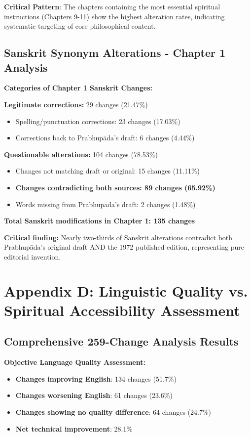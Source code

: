 \documentclass[11pt,twoside]{book}
\begin{document}
\textbf{\textbf{Critical Pattern}}: The chapters containing the most essential spiritual instructions (Chapters 9-11) show the highest alteration rates, indicating systematic targeting of core philosophical content.
\section*{Sanskrit Synonym Alterations - Chapter 1 Analysis}
\label{sec:org0084163}

\textbf{\textbf{Categories of Chapter 1 Sanskrit Changes:}}

\textbf{\textbf{Legitimate corrections:}} 29 changes (21.47\%)
\begin{itemize}
\item Spelling/punctuation corrections: 23 changes (17.03\%)
\item Corrections back to Prabhupāda's draft: 6 changes (4.44\%)
\end{itemize}

\textbf{\textbf{Questionable alterations:}} 104 changes (78.53\%)  
\begin{itemize}
\item Changes not matching draft or original: 15 changes (11.11\%)
\item \textbf{\textbf{Changes contradicting both sources: 89 changes (65.92\%)}}
\item Words missing from Prabhupāda's draft: 2 changes (1.48\%)
\end{itemize}

\textbf{\textbf{Total Sanskrit modifications in Chapter 1: 135 changes}}

\textbf{\textbf{Critical finding:}} Nearly two-thirds of Sanskrit alterations contradict both Prabhupāda's original draft AND the 1972 published edition, representing pure editorial invention.
\chapter*{Appendix D: Linguistic Quality vs. Spiritual Accessibility Assessment}
\label{sec:org9ab06ae}

\section*{Comprehensive 259-Change Analysis Results}
\label{sec:orgff39415}

\textbf{\textbf{Objective Language Quality Assessment:}}
\begin{itemize}
\item \textbf{\textbf{Changes improving English}}: 134 changes (51.7\%)
\item \textbf{\textbf{Changes worsening English}}: 61 changes (23.6\%)
\item \textbf{\textbf{Changes showing no quality difference}}: 64 changes (24.7\%)
\item \textbf{\textbf{Net technical improvement}}: 28.1\%
\end{itemize}
\end{document}
